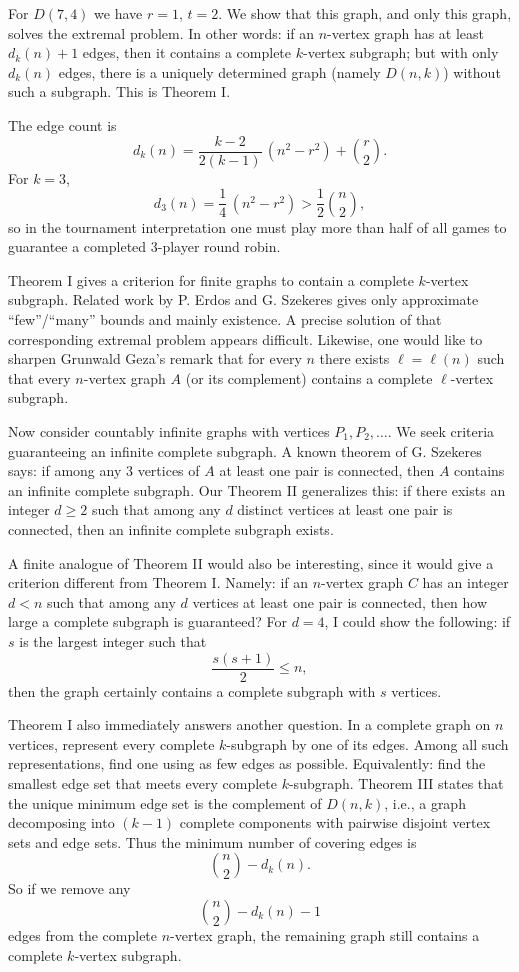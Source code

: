 \documentclass[11pt]{article}
\begin{document}
For $D(7,4)$ we have $r=1$, $t=2$. We show that this graph, and only this graph, solves the extremal problem. In other words: if an $n$-vertex graph has at least $d_k(n)+1$ edges, then it contains a complete $k$-vertex subgraph; but with only $d_k(n)$ edges, there is a uniquely determined graph (namely $D(n,k)$) without such a subgraph. This is Theorem I.

The edge count is
\[
d_k(n)=\frac{k-2}{2(k-1)}\,(n^2-r^2)+\binom{r}{2}.
\]
For $k=3$,
\[
d_3(n)=\frac14\,(n^2-r^2)>\frac12\binom{n}{2},
\]
so in the tournament interpretation one must play more than half of all games to guarantee a completed 3-player round robin.

Theorem I gives a criterion for finite graphs to contain a complete $k$-vertex subgraph. Related work by P. Erdos and G. Szekeres gives only approximate ``few''/``many'' bounds and mainly existence. A precise solution of that corresponding extremal problem appears difficult. Likewise, one would like to sharpen Grunwald Geza's remark that for every $n$ there exists $\ell=\ell(n)$ such that every $n$-vertex graph $A$ (or its complement) contains a complete $\ell$-vertex subgraph.

Now consider countably infinite graphs with vertices $P_1,P_2,\dots$. We seek criteria guaranteeing an infinite complete subgraph. A known theorem of G. Szekeres says: if among any 3 vertices of $A$ at least one pair is connected, then $A$ contains an infinite complete subgraph. Our Theorem II generalizes this: if there exists an integer $d\ge2$ such that among any $d$ distinct vertices at least one pair is connected, then an infinite complete subgraph exists.

A finite analogue of Theorem II would also be interesting, since it would give a criterion different from Theorem I. Namely: if an $n$-vertex graph $C$ has an integer $d<n$ such that among any $d$ vertices at least one pair is connected, then how large a complete subgraph is guaranteed? For $d=4$, I could show the following: if $s$ is the largest integer such that
\[
\frac{s(s+1)}{2}\le n,
\]
then the graph certainly contains a complete subgraph with $s$ vertices.

Theorem I also immediately answers another question. In a complete graph on $n$ vertices, represent every complete $k$-subgraph by one of its edges. Among all such representations, find one using as few edges as possible. Equivalently: find the smallest edge set that meets every complete $k$-subgraph. Theorem III states that the unique minimum edge set is the complement of $D(n,k)$, i.e., a graph decomposing into $(k-1)$ complete components with pairwise disjoint vertex sets and edge sets. Thus the minimum number of covering edges is
\[
\binom{n}{2}-d_k(n).
\]
So if we remove any
\[
\binom{n}{2}-d_k(n)-1
\]
edges from the complete $n$-vertex graph, the remaining graph still contains a complete $k$-vertex subgraph.
\end{document}
